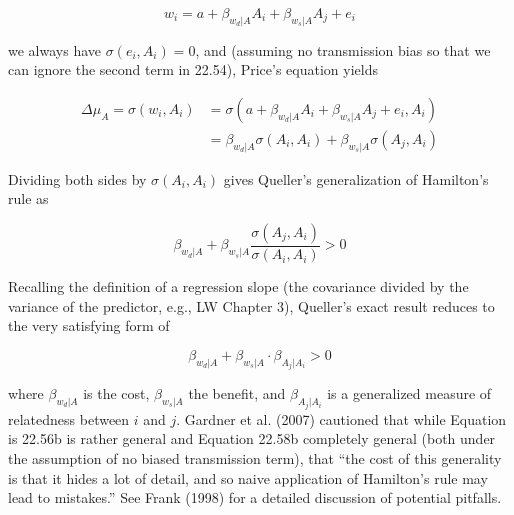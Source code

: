 \documentclass{article}
\begin{document}
\begin{equation}
w_{i}=a+\beta_{w_{d}|A}A_{i}+\beta_{w_{s}|A}A_{j}+e_{i}
\tag{22.57a}
\label{eq:22_57a}
\end{equation}

we always have  $ \sigma(e_i, A_i) = 0 $, and (assuming no transmission bias so that we can ignore the second term in 22.54), Price's equation yields

\begin{equation}
\begin{aligned}\Delta\mu_{A}=\sigma(w_{i},A_{i})&=\sigma(a+\beta_{w_{d}|A}A_{i}+\beta_{w_{s}|A}A_{j}+e_{i},A_{i})\\&=\beta_{w_{d}|A}\sigma(A_{i},A_{i})+\beta_{w_{s}|A}\sigma(A_{j},A_{i})\end{aligned}
\tag{22.57b}
\label{eq:22_57b}
\end{equation}

Dividing both sides by  $ \sigma(A_{i}, A_{i}) $ gives Queller's generalization of Hamilton's rule as

\begin{equation}
\beta_{w_{d}|A}+\beta_{w_{s}|A}\frac{\sigma(A_{j},A_{i})}{\sigma(A_{i},A_{i})}>0
\tag{22.58a}
\label{eq:22_58a}
\end{equation}

Recalling the definition of a regression slope (the covariance divided by the variance of the predictor, e.g., LW Chapter 3), Queller's exact result reduces to the very satisfying form of

\begin{equation}
\beta_{w_{d}|A}+\beta_{w_{s}|A}\cdot\beta_{A_{j}|A_{i}}>0
\tag{22.58b}
\label{eq:22_58b}
\end{equation}

where  $ \beta_{w_d|A} $ is the cost,  $ \beta_{w_s|A} $ the benefit, and  $ \beta_{A_j|A_i} $ is a generalized measure of relatedness between  $ i $ and  $ j $. Gardner et al. (2007) cautioned that while Equation is 22.56b is rather general and Equation 22.58b completely general (both under the assumption of no biased transmission term), that “the cost of this generality is that it hides a lot of detail, and so naive application of Hamilton’s rule may lead to mistakes.” See Frank (1998) for a detailed discussion of potential pitfalls.
\end{document}

